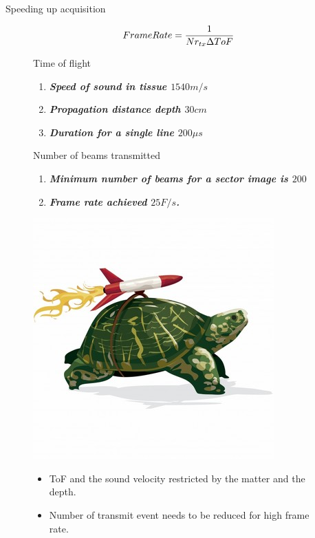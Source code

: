 \documentclass[t,12pt,english
\ifx\beamermode\undefined\else,\beamermode\fi
]{beamer}
\begin{document}
\begin{frame}{Speeding up acquisition}



\begin{figure}[!htb]

\begin{equation}
\tiny FrameRate=\frac{1}{Nr_{tx}\Delta ToF}
\end{equation}
\begin{block}{\footnotesize{Time of flight~}}\tiny{}
\begin{enumerate} 
\vspace{0.05cm}
     \item \tiny{\textbf{\textit{Speed of sound in tissue \tiny{$1540 m/s$}}}}
     \item \tiny{\textbf{\textit{Propagation distance depth \tiny{$30 cm$}}}}
     \item \tiny{\textbf{\textit{Duration for a single line \tiny{$200 \mu s$}}}}
\end{enumerate}
\end{block}

\begin{block}{\footnotesize{Number of beams transmitted}}\tiny{}
\begin{enumerate} 
\vspace{0.05cm}
     \item \tiny{\textbf{\textit{Minimum number of beams for a sector image is $200$}}}
     \item \tiny{\textbf{\textit{Frame rate achieved $25 F/s$.}}}
\end{enumerate}
\end{block}

\endminipage
{}
\centering
\includegraphics[width=.5\textwidth]{11.jpg}\\

\endminipage

\begin{itemize}
\color{red}
\item \small ToF and the sound velocity restricted by the matter and the depth.
\item \small Number of transmit event needs to be reduced for high frame rate. 
\end{itemize}

\end{figure}

\end{frame}
\end{document}
